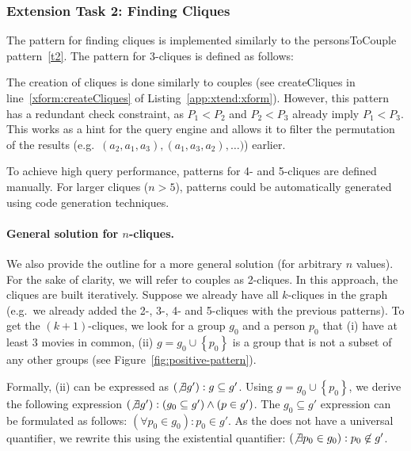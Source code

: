\subsubsection{Extension Task 2: Finding Cliques}
\label{et2}

The pattern for finding cliques is implemented similarly to the \textsf{personsToCouple} pattern~\ref{t2}. The pattern for 3-cliques is defined as follows:


The creation of cliques is done similarly to couples (see \textsf{createCliques} in line~\ref{xform:createCliques} of Listing~\ref{app:xtend:xform}). However, this pattern has a redundant check constraint, as $P_1 < P_2$ and $P_2 < P_3$ already imply $P_1 < P_3$. This works as a hint for the query engine and allows it to filter the permutation of the results (e.g.\ $(a_2, a_1, a_3), (a_1, a_3, a_2), \ldots)$) earlier.

To achieve high query performance, patterns for 4- and 5-cliques are defined manually. For larger cliques ($n > 5$), patterns could be automatically generated using code generation techniques.

\paragraph{General solution for $n$-cliques.} We also provide the outline for a more general solution (for arbitrary $n$ values). For the sake of clarity, we will refer to couples as 2-cliques. In this approach, the cliques are built iteratively. Suppose we already have all $k$-cliques in the graph (e.g.\ we already added the 2-, 3-, 4- and 5-cliques with the previous patterns). To get the $(k+1)$-cliques, we look for a group $g_0$ and a person $p_0$ that (i) have at least 3 movies in common, (ii) $ g = g_0 \cup \left\{p_0\right\} $ is a group that is not a subset of any other groups (see Figure~\ref{fig:positive-pattern}).

Formally, (ii) can be expressed as $ \left(\not\exists g'\right): g \subseteq g' $. Using $ g = g_0 \cup \left\{p_0\right\} $, we derive the following expression $\left(\not\exists g'\right): \left(g_0 \subseteq g'\right) \wedge \left(p \in g'\right)$. The $g_0 \subseteq g'$ expression can be formulated as follows: $\left(\forall p_0 \in g_0\right): p_0 \in g'$. As the \iqpl{} does not have a universal quantifier, we rewrite this using the existential quantifier: $\left(\not\exists p_0 \in g_0\right): p_0 \not\in g'$.

